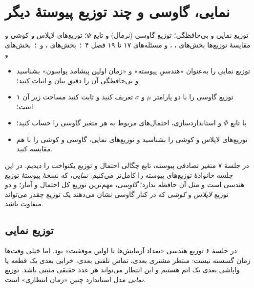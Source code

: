 \chapter{نمایی، گاوسی و چند توزیع پیوستهٔ دیگر}
\label{ch:s8}

{توزیع نمایی و بی‌حافظگی؛ توزیع گاوسی (نرمال) و تابع $\Phi$؛ توزیع‌های لاپلاس و کوشی و مقایسهٔ  توزیع‌ها}
{ بخش‌های ، ،  و مسئله‌های ۱۷ تا ۱۹ فصل ۴ \,؛\,  بخش‌های ،  و  \,؛\,  بخش‌های  و }
{\begin{itemize}
  \item توزیع نمایی را به‌عنوان «هندسیِ پیوسته» و «زمان اولین پیشامد پواسون» بشناسید و بی‌حافظگی آن را دقیق بیان و اثبات کنید؛
  \item توزیع گاوسی را با دو پارامتر $\mu$ و $\sigma$ تعریف کنید و ثابت کنید مساحت زیر آن ۱ است؛
  \item با تابع $\Phi$ و استانداردسازی، احتمال‌های مربوط به هر متغیر گاوسی را حساب کنید؛
  \item توزیع‌های لاپلاس و کوشی را بشناسید و  توزیع‌های نمایی، گاوسی و کوشی را با هم مقایسه کنید.
\end{itemize}}

در جلسهٔ ۷ متغیر تصادفی پیوسته، تابع چگالی احتمال و توزیع یکنواخت را دیدیم. در این جلسه خانوادهٔ توزیع‌های پیوسته را کامل‌تر می‌کنیم: \emph{نمایی}، که نسخهٔ پیوستهٔ توزیع هندسی است و مثل آن حافظه ندارد؛ \emph{گاوسی}، مهم‌ترین توزیع کل احتمال و آمار؛ و دو توزیع \emph{لاپلاس} و \emph{کوشی} که در کنار گاوسی نشان می‌دهند  یک توزیع چقدر می‌تواند متفاوت باشد.

\section{توزیع نمایی}
\label{sec:exp}

در جلسهٔ ۶ توزیع هندسی «تعداد آزمایش‌ها تا اولین موفقیت» بود. اما خیلی وقت‌ها زمان گسسته نیست: منتظر مشتری بعدی، تماس تلفنی بعدی، خرابی بعدی یک قطعه یا واپاشی بعدی یک اتم هستیم و این انتظار می‌تواند هر عدد حقیقی مثبتی باشد. توزیع \emph{نمایی} مدل استاندارد چنین «زمان انتظاری» است.

